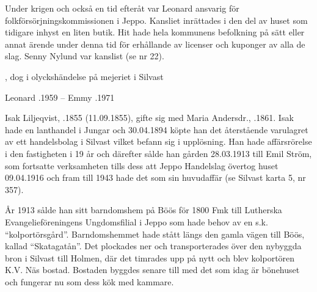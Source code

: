 
Under krigen och också en tid efteråt var Leonard ansvarig för folkförsörjningskommissionen i Jeppo. Kansliet inrättades i den del av huset som tidigare inhyst en liten butik. Hit hade hela kommunens befolkning på sätt eller annat ärende under denna tid för erhållande av licenser och kuponger av alla de slag. Senny Nylund var kanslist (se nr 22).
\begin{jhchildren}
  \item {}, dog i olyckshändelse på mejeriet i Silvast
  \item {}
  \item {}
  \item {}
\end{jhchildren}
Leonard .1959  --  Emmy .1971


Isak Liljeqvist, .1855 (11.09.1855), gifte sig med Maria Andersdr., .1861. Isak hade  en lanthandel i Jungar och 30.04.1894 köpte han det återstående varulagret av ett handelsbolag i Silvast vilket befann sig i upplösning. Han hade affärsrörelse i den fastigheten i 19 år och därefter sålde han gården 28.03.1913 till Emil Ström,  som fortsatte verksamheten tills dess att Jeppo Handelslag övertog huset 09.04.1916 och fram till 1943 hade det som sin huvudaffär (se Silvast karta 5, nr 357).

År 1913 sålde han sitt barndomshem på Böös för 1800 Fmk till Lutherska Evangelieföreningens Ungdomsfilial i Jeppo som hade behov av en s.k. ``kolportörsgård''. Barndomshemmet hade stått längs den gamla vägen till Böös, kallad ``Skatagatån''. Det plockades ner och transporterades över den nybyggda bron i Silvast till Holmen, där det timrades upp på nytt och blev kolportören K.V. Näs bostad. Bostaden byggdes senare till med det som idag är bönehuset och fungerar nu som dess kök med kammare.

